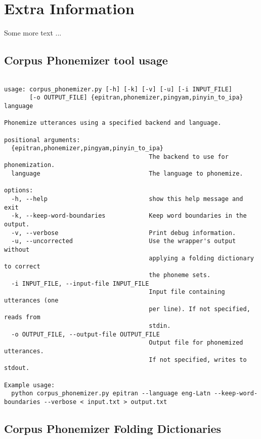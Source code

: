 \appendix
\chapter{Extra Information}
Some more text ...

\section{Corpus Phonemizer tool usage}
\label{appendix:corpus-phonemizer-usage}

\lstset{basicstyle=\small\ttfamily}
\begin{lstlisting}[float=tp, breaklines=true,caption={An extract taken from the help menu of \corpusphonemizer, displaying the tool's usage.}]

usage: corpus_phonemizer.py [-h] [-k] [-v] [-u] [-i INPUT_FILE]
       [-o OUTPUT_FILE] {epitran,phonemizer,pingyam,pinyin_to_ipa} language

Phonemize utterances using a specified backend and language.

positional arguments:
  {epitran,phonemizer,pingyam,pinyin_to_ipa}
                                        The backend to use for phonemization.
  language                              The language to phonemize.

options:
  -h, --help                            show this help message and exit
  -k, --keep-word-boundaries            Keep word boundaries in the output.
  -v, --verbose                         Print debug information.
  -u, --uncorrected                     Use the wrapper's output without
                                        applying a folding dictionary to correct
                                        the phoneme sets.
  -i INPUT_FILE, --input-file INPUT_FILE
                                        Input file containing utterances (one
                                        per line). If not specified, reads from
                                        stdin.
  -o OUTPUT_FILE, --output-file OUTPUT_FILE
                                        Output file for phonemized utterances.
                                        If not specified, writes to stdout.

Example usage:
  python corpus_phonemizer.py epitran --language eng-Latn --keep-word-boundaries --verbose < input.txt > output.txt
\end{lstlisting}

\section{Corpus Phonemizer Folding Dictionaries}
\label{appendix:folding-dictionaries}